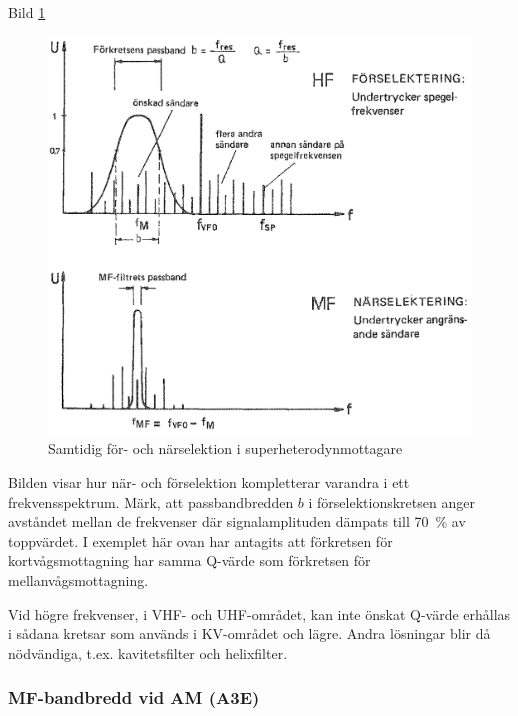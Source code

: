 Bild \ref{fig:bildII4-25}

\begin{figure}
  \includegraphics[width=\textwidth]{images/cropped_pdfs/bild_2_4-25.pdf}
  \caption{Samtidig för- och närselektion i superheterodynmottagare}
  \label{fig:bildII4-25}
\end{figure}

Bilden visar hur när- och förselektion kompletterar varandra i ett
frekvensspektrum.  Märk, att passbandbredden \(b\) i
förselektionskretsen anger avståndet mellan de frekvenser där
signalamplituden dämpats till 70~\% av toppvärdet. I exemplet här ovan
har antagits att förkretsen för kortvågsmottagning har samma Q-värde
som förkretsen för mellanvågsmottagning.

Vid högre frekvenser, i VHF- och UHF-området, kan inte önskat Q-värde
erhållas i sådana kretsar som används i KV-området och lägre. Andra
lösningar blir då nödvändiga, t.ex. kavitetsfilter och helixfilter.

\subsubsection{MF-bandbredd vid AM (A3E)}

